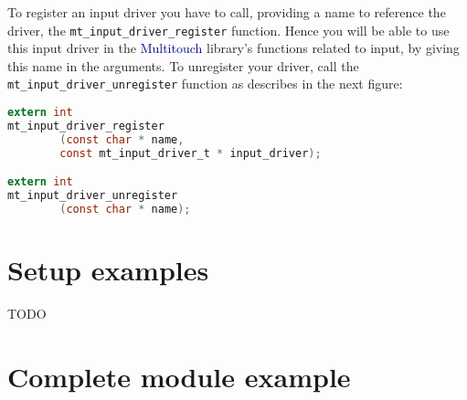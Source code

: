 To register an input driver you have to call, providing a name 
to reference the driver, the \texttt{mt\_input\_driver\_register} 
function. Hence you will be able to use this input driver in the 
\textcolor{darkblue}{Multitouch} library's functions related to input,
by giving this name in the arguments.
To unregister your driver, call the \texttt{mt\_input\_driver\_unregister} 
function as describes in the next figure:
\begin{lstlisting}[language=C,
caption=Input's driver management functions]
extern int
mt_input_driver_register
        (const char * name,
        const mt_input_driver_t * input_driver);

extern int
mt_input_driver_unregister
        (const char * name);
\end{lstlisting}

%
%
\section{Setup examples}
TODO

%
%
\section{Complete module example}

